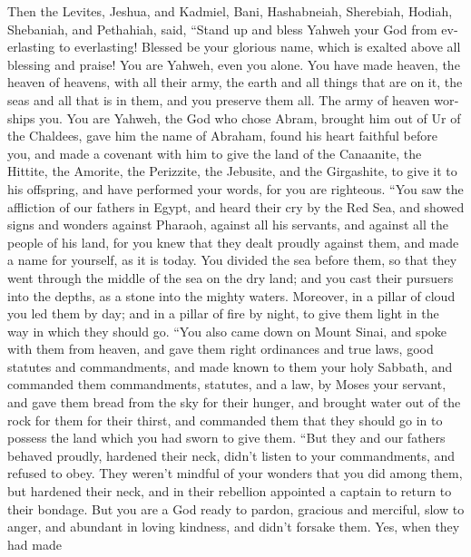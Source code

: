 \begin{paracol}{2}
\begin{otherlanguage}{english}
 Then the Levites, Jeshua, and Kadmiel, Bani, Hashabneiah,
Sherebiah, Hodiah, Shebaniah, and Pethahiah, said, ``Stand up and bless
Yahweh your God from everlasting to everlasting! Blessed be your
glorious name, which is exalted above all blessing and praise!
 You are Yahweh, even you alone. You have made heaven, the
heaven of heavens, with all their army, the earth and all things that
are on it, the seas and all that is in them, and you preserve them all.
The army of heaven worships you.  You are Yahweh, the God
who chose Abram, brought him out of Ur of the Chaldees, gave him the
name of Abraham,  found his heart faithful before you, and
made a covenant with him to give the land of the Canaanite, the Hittite,
the Amorite, the Perizzite, the Jebusite, and the Girgashite, to give it
to his offspring, and have performed your words, for you are righteous.
 ``You saw the affliction of our fathers in Egypt, and
heard their cry by the Red Sea,  and showed signs and
wonders against Pharaoh, against all his servants, and against all the
people of his land, for you knew that they dealt proudly against them,
and made a name for yourself, as it is today.  You
divided the sea before them, so that they went through the middle of the
sea on the dry land; and you cast their pursuers into the depths, as a
stone into the mighty waters.  Moreover, in a pillar of
cloud you led them by day; and in a pillar of fire by night, to give
them light in the way in which they should go.  ``You
also came down on Mount Sinai, and spoke with them from heaven, and gave
them right ordinances and true laws, good statutes and commandments,
 and made known to them your holy Sabbath, and commanded
them commandments, statutes, and a law, by Moses your servant,
 and gave them bread from the sky for their hunger, and
brought water out of the rock for them for their thirst, and commanded
them that they should go in to possess the land which you had sworn to
give them.  ``But they and our fathers behaved proudly,
hardened their neck, didn't listen to your commandments, 
and refused to obey. They weren't mindful of your wonders that you did
among them, but hardened their neck, and in their rebellion appointed a
captain to return to their bondage. But you are a God ready to pardon,
gracious and merciful, slow to anger, and abundant in loving kindness,
and didn't forsake them.  Yes, when they had made

\end{otherlanguage}
\end{paracol}
